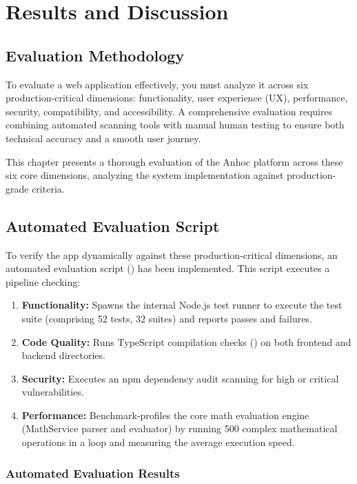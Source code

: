 \chapter{Results and Discussion}

\section{Evaluation Methodology}

To evaluate a web application effectively, you must analyze it across six production-critical dimensions: functionality, user experience (UX), performance, security, compatibility, and accessibility. A comprehensive evaluation requires combining automated scanning tools with manual human testing to ensure both technical accuracy and a smooth user journey.

This chapter presents a thorough evaluation of the Anhoc platform across these six core dimensions, analyzing the system implementation against production-grade criteria.

\section{Automated Evaluation Script}

To verify the app dynamically against these production-critical dimensions, an automated evaluation script () has been implemented. This script executes a pipeline checking:
\begin{enumerate}
  \item \textbf{Functionality:} Spawns the internal Node.js test runner to execute the test suite (comprising 52 tests, 32 suites) and reports passes and failures.
  \item \textbf{Code Quality:} Runs TypeScript compilation checks () on both frontend and backend directories.
  \item \textbf{Security:} Executes an npm dependency audit scanning for high or critical vulnerabilities.
  \item \textbf{Performance:} Benchmark-profiles the core math evaluation engine (MathService parser and evaluator) by running 500 complex mathematical operations in a loop and measuring the average execution speed.
\end{enumerate}


\subsection{Automated Evaluation Results}

